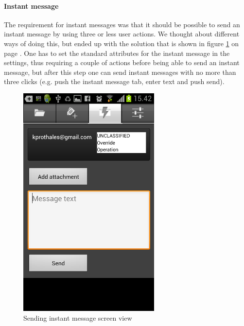 \newpage

\paragraph{Instant message}\hfill
\newline
The requirement for instant messages was that it should be possible to send an instant message by using three or less user actions. We thought about different ways of doing this, but ended up with the solution that is shown in figure \ref{fig:frontend_instamessage} on page \pageref{fig:frontend_instamessage}.
One has to set the standard attributes for the instant message in the settings, thus requiring a couple of actions before being able to send an instant message, but after this step one can send instant messages with no more than three clicks (e.g. push the instant message tab, enter text and push send). 

\begin{figure}[H]
\begin{center}
\includegraphics{instantmessage_final}
\end{center}
\caption{Sending instant message screen view} \label{fig:frontend_instamessage}
\end{figure}

